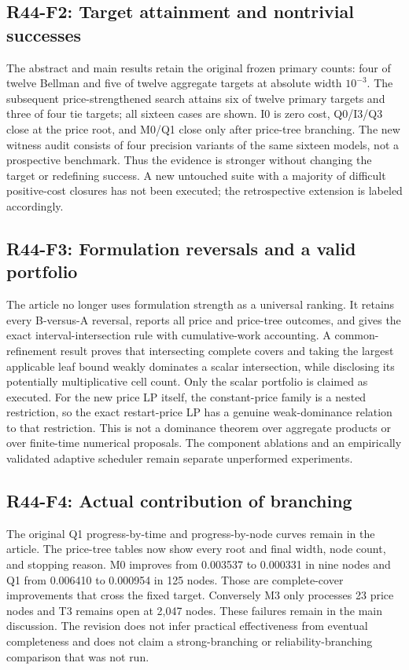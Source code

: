 \subsection{R44-F2: Target attainment and nontrivial successes}
The abstract and main results retain the original frozen primary counts: four of twelve Bellman and five of twelve aggregate targets at absolute width $10^{-3}$. The subsequent price-strengthened search attains six of twelve primary targets and three of four tie targets; all sixteen cases are shown. I0 is zero cost, Q0/I3/Q3 close at the price root, and M0/Q1 close only after price-tree branching. The new witness audit consists of four precision variants of the same sixteen models, not a prospective benchmark. Thus the evidence is stronger without changing the target or redefining success. A new untouched suite with a majority of difficult positive-cost closures has not been executed; the retrospective extension is labeled accordingly.

\subsection{R44-F3: Formulation reversals and a valid portfolio}
The article no longer uses formulation strength as a universal ranking. It retains every B-versus-A reversal, reports all price and price-tree outcomes, and gives the exact interval-intersection rule with cumulative-work accounting. A common-refinement result proves that intersecting complete covers and taking the largest applicable leaf bound weakly dominates a scalar intersection, while disclosing its potentially multiplicative cell count. Only the scalar portfolio is claimed as executed. For the new price LP itself, the constant-price family is a nested restriction, so the exact restart-price LP has a genuine weak-dominance relation to that restriction. This is not a dominance theorem over aggregate products or over finite-time numerical proposals. The component ablations and an empirically validated adaptive scheduler remain separate unperformed experiments.

\subsection{R44-F4: Actual contribution of branching}
The original Q1 progress-by-time and progress-by-node curves remain in the article. The price-tree tables now show every root and final width, node count, and stopping reason. M0 improves from 0.003537 to 0.000331 in nine nodes and Q1 from 0.006410 to 0.000954 in 125 nodes. Those are complete-cover improvements that cross the fixed target. Conversely M3 only processes 23 price nodes and T3 remains open at 2,047 nodes. These failures remain in the main discussion. The revision does not infer practical effectiveness from eventual completeness and does not claim a strong-branching or reliability-branching comparison that was not run.


